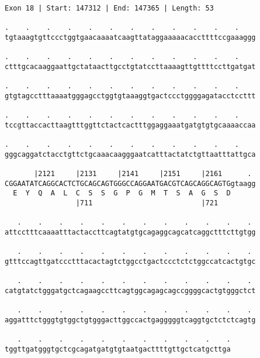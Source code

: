 \documentclass{article}
\begin{document}
\newpage
\begin{Verbatim}
Exon 18 | Start: 147312 | End: 147365 | Length: 53
 
.    .    .    .    .    .    .    .    .    .    .    .    
tgtaaagtgttccctggtgaacaaaatcaagttataggaaaaacaccttttccgaaaggg
  
.    .    .    .    .    .    .    .    .    .    .    .    
ctttgcacaaggaattgctataacttgcctgtatccttaaaagttgttttccttgatgat
  
.    .    .    .    .    .    .    .    .    .    .    .    
gtgtagcctttaaaatgggagcctggtgtaaaggtgactccctggggagatacctccttt
  
.    .    .    .    .    .    .    .    .    .    .    .    
tccgttaccacttaagtttggttctactcactttggaggaaatgatgtgtgcaaaaccaa
  
.    .    .    .    .    .    .    .    .    .    .    .    
gggcaggatctacctgttctgcaaacaagggaatcatttactatctgttaatttattgca
  
       |2121     |2131     |2141     |2151     |2161      . 
CGGAATATCAGGCACTCTGCAGCAGTGGGCCAGGAATGACGTCAGCAGGCAGTGgtaagg
  E  Y  Q  A  L  C  S  S  G  P  G  M  T  S  A  G  S  D      
                 |711                          |721         
  
   .    .    .    .    .    .    .    .    .    .    .    . 
attcctttcaaaatttactaccttcagtatgtgcagaggcagcatcaggctttcttgtgg
  
   .    .    .    .    .    .    .    .    .    .    .    . 
gtttccagttgatccctttacactagtctggcctgactccctctctggccatcactgtgc
  
   .    .    .    .    .    .    .    .    .    .    .    . 
catgtatctgggatgctcagaagccttcagtggcagagcagccggggcactgtgggctct
  
   .    .    .    .    .    .    .    .    .    .    .    . 
aggatttctgggtgtggctgtgggacttggccactgagggggtcaggtgctctctcagtg
  
   .    .    .    .    .    .    .    .    .    .    .
tggttgatgggtgctcgcagatgatgtgtaatgacttttgttgctcatgcttga
\end{Verbatim}
\newpage
\end{document}
